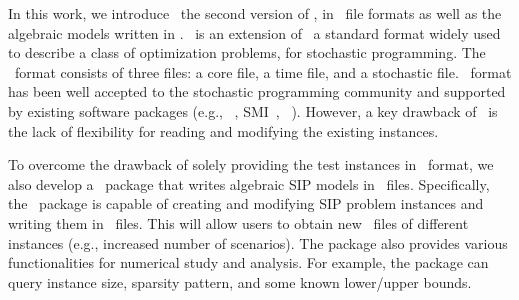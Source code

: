 In this work, we introduce \siplibtwo\, the second version of \siplib, in \smps\ file formats \cite{smps} as well as the algebraic models written in {\julia}. \smps\ is an extension of \mps\, a standard format widely used to describe a class of optimization problems, for stochastic programming. The \smps\ format consists of three files: a core file, a time file, and a stochastic file.  \smps\ format has been well accepted to the stochastic programming community and supported by existing software packages (e.g., {\dsp}~\cite{web:DSP}, \textsf{SMI}~\cite{web:SMI}, {\scip}~\cite{SCIP}). However, a key drawback of \smps\ is the lack of flexibility for reading and modifying the existing instances. 

To overcome the drawback of solely providing the test instances in \smps\ format, we also develop a \julia\ package that writes algebraic SIP models in \smps\ files. Specifically, the \julia\ package is capable of creating and modifying SIP problem instances and writing them in \smps\ files. This will allow users to obtain new \smps\ files of different instances (e.g., increased number of scenarios). The package also provides various functionalities for numerical study and analysis. For example, the package can query instance size, sparsity pattern, and some known lower/upper bounds. 

